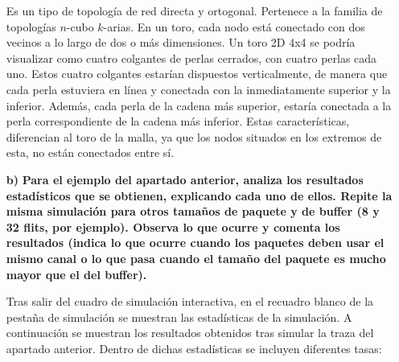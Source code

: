 \begin{itemize}
\begin{keyconceptbox}[Wormhole]
    \end{keyconceptbox}

    \begin{keyconceptbox}[Toro]
        Es un tipo de topología de red directa y ortogonal. Pertenece a la familia de topologías $n$-cubo $k$-arias. En un toro, cada nodo está conectado con dos vecinos a lo largo de dos o más dimensiones. Un toro 2D 4x4 se podría visualizar como cuatro colgantes de perlas cerrados, con cuatro perlas cada uno. Estos cuatro colgantes estarían dispuestos verticalmente, de manera que cada perla estuviera en línea y conectada con la inmediatamente superior y la inferior. Además, cada perla de la cadena más superior, estaría conectada a la perla correspondiente de la cadena más inferior. Estas características, diferencian al toro de la malla, ya que los nodos situados en los extremos de esta, no están conectados entre sí.

        \vspace{10pt}

        \centering 	{} \label{fig:red-toroidal}
    \end{keyconceptbox}

    \item[\textbf{b)}] \textbf{Para el ejemplo del apartado anterior, analiza los resultados estadísticos que se obtienen, explicando cada uno de ellos. Repite la misma simulación para otros tamaños de paquete y de buffer (8 y 32 flits, por ejemplo). Observa lo que ocurre y comenta los resultados (indica lo que ocurre cuando los paquetes deben usar el mismo canal o lo que pasa cuando el tamaño del paquete es mucho mayor que el del buffer).}

    Tras salir del cuadro de simulación interactiva, en el recuadro blanco de la pestaña de simulación se muestran las estadísticas de la simulación. A continuación se muestran los resultados obtenidos tras simular la traza del apartado anterior. Dentro de dichas estadísticas se incluyen diferentes tasas:


\end{itemize}

